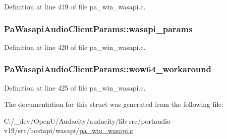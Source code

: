Definition at line 419 of file pa\+\_\+win\+\_\+wasapi.\+c.

\subsubsection[{\texorpdfstring{wasapi\+\_\+params}{wasapi_params}}]{ Pa\+Wasapi\+Audio\+Client\+Params\+::wasapi\+\_\+params}\hypertarget{struct_pa_wasapi_audio_client_params_a0b9dcf2124b754e948e50f44c2fe3638}{}\label{struct_pa_wasapi_audio_client_params_a0b9dcf2124b754e948e50f44c2fe3638}


Definition at line 420 of file pa\+\_\+win\+\_\+wasapi.\+c.

\subsubsection[{\texorpdfstring{wow64\+\_\+workaround}{wow64_workaround}}]{ Pa\+Wasapi\+Audio\+Client\+Params\+::wow64\+\_\+workaround}\hypertarget{struct_pa_wasapi_audio_client_params_a0886e7cdcd3e6f7f989625d7f7493eb9}{}\label{struct_pa_wasapi_audio_client_params_a0886e7cdcd3e6f7f989625d7f7493eb9}


Definition at line 425 of file pa\+\_\+win\+\_\+wasapi.\+c.



The documentation for this struct was generated from the following file\+:\begin{DoxyCompactItemize}
\item 
C\+:/\+\_\+dev/\+Open\+U/\+Audacity/audacity/lib-\/src/portaudio-\/v19/src/hostapi/wasapi/\hyperlink{pa__win__wasapi_8c}{pa\+\_\+win\+\_\+wasapi.\+c}\end{DoxyCompactItemize}

